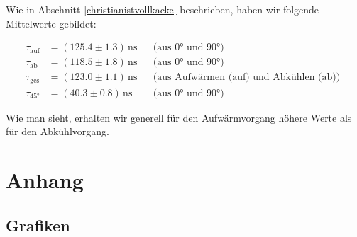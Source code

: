 \documentclass[12pt]{article}
\begin{document}
Wie in Abschnitt \ref{christianistvollkacke} beschrieben, haben wir folgende Mittelwerte gebildet: 

\begin{align*}
\tau_\mathrm{auf} &= (125.4 \pm 1.3)\,\mathrm{ns}  &&\text{(aus 0° und 90°) }\\
\tau_\mathrm{ab} &= (118.5 \pm 1.8) \,\mathrm{ns}   & &\text{(aus 0° und 90°) }\\
\tau_\mathrm{ges} &= (123.0 \pm 1.1) \,\mathrm{ns}   & &\text{(aus Aufwärmen (auf) und Abkühlen (ab)) }\\
\tau_{45°} &= (40.3 \pm 0.8) \,\mathrm{ns}    &&\text{(aus 0° und 90°) }
\end{align*}

Wie man sieht, erhalten wir generell für den Aufwärmvorgang höhere Werte als für den Abkühlvorgang. 


\newpage
\section{Anhang}

\subsection{Grafiken}\label{bilder}
\end{document}
